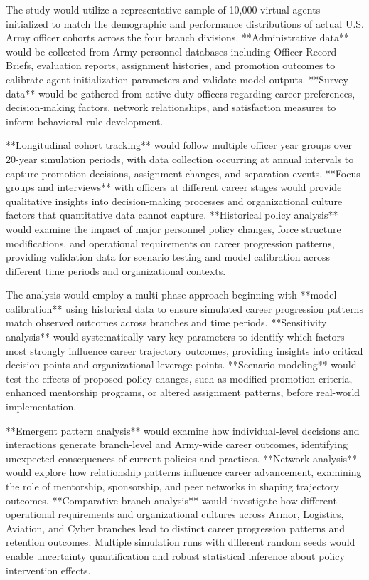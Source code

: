 \documentclass[main.tex]{subfiles}
\begin{document}

The study would utilize a representative sample of 10,000 virtual agents initialized to match the demographic and performance distributions of actual U.S. Army officer cohorts across the four branch divisions. **Administrative data** would be collected from Army personnel databases including Officer Record Briefs, evaluation reports, assignment histories, and promotion outcomes to calibrate agent initialization parameters and validate model outputs. **Survey data** would be gathered from active duty officers regarding career preferences, decision-making factors, network relationships, and satisfaction measures to inform behavioral rule development.

**Longitudinal cohort tracking** would follow multiple officer year groups over 20-year simulation periods, with data collection occurring at annual intervals to capture promotion decisions, assignment changes, and separation events. **Focus groups and interviews** with officers at different career stages would provide qualitative insights into decision-making processes and organizational culture factors that quantitative data cannot capture. **Historical policy analysis** would examine the impact of major personnel policy changes, force structure modifications, and operational requirements on career progression patterns, providing validation data for scenario testing and model calibration across different time periods and organizational contexts.


The analysis would employ a multi-phase approach beginning with **model calibration** using historical data to ensure simulated career progression patterns match observed outcomes across branches and time periods. **Sensitivity analysis** would systematically vary key parameters to identify which factors most strongly influence career trajectory outcomes, providing insights into critical decision points and organizational leverage points. **Scenario modeling** would test the effects of proposed policy changes, such as modified promotion criteria, enhanced mentorship programs, or altered assignment patterns, before real-world implementation.

**Emergent pattern analysis** would examine how individual-level decisions and interactions generate branch-level and Army-wide career outcomes, identifying unexpected consequences of current policies and practices. **Network analysis** would explore how relationship patterns influence career advancement, examining the role of mentorship, sponsorship, and peer networks in shaping trajectory outcomes. **Comparative branch analysis** would investigate how different operational requirements and organizational cultures across Armor, Logistics, Aviation, and Cyber branches lead to distinct career progression patterns and retention outcomes. Multiple simulation runs with different random seeds would enable uncertainty quantification and robust statistical inference about policy intervention effects.
\end{document}
